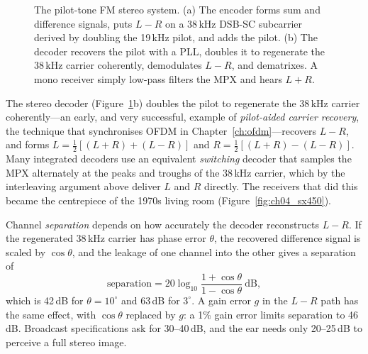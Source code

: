 \begin{figure}[htbp]
\caption{The pilot-tone FM stereo system. (a) The encoder forms sum and difference signals, puts $L-R$ on a
38\,kHz DSB-SC subcarrier derived by doubling the 19\,kHz pilot, and adds the pilot. (b) The decoder recovers
the pilot with a PLL, doubles it to regenerate the 38\,kHz carrier coherently, demodulates $L-R$, and
dematrixes. A mono receiver simply low-pass filters the MPX and hears $L+R$.}
\label{fig:ch04_stereo_codec}
\end{figure}

The stereo decoder (Figure~\ref{fig:ch04_stereo_codec}b) doubles the pilot to regenerate the 38\,kHz carrier
coherently---an early, and very successful, example of \emph{pilot-aided carrier recovery}, the technique
that synchronises OFDM in Chapter~\ref{ch:ofdm}---recovers $L-R$, and forms $L=\frac12[(L+R)+(L-R)]$ and
$R=\frac12[(L+R)-(L-R)]$. Many integrated decoders use an equivalent \emph{switching} decoder that samples
the MPX alternately at the peaks and troughs of the 38\,kHz carrier, which by the interleaving argument
above deliver $L$ and $R$ directly. The receivers that did this became the centrepiece of the 1970s living
room (Figure~\ref{fig:ch04_sx450}).


Channel \emph{separation} depends on how accurately the decoder reconstructs $L-R$. If the regenerated
38\,kHz carrier has phase error $\theta$, the recovered difference signal is scaled by $\cos\theta$, and the
leakage of one channel into the other gives a separation of
\begin{equation}
\text{separation}=20\log_{10}\frac{1+\cos\theta}{1-\cos\theta}\ \text{dB},
\end{equation}
which is 42\,dB for $\theta=10^\circ$ and 63\,dB for $3^\circ$. A gain error $g$ in the $L-R$ path has the
same effect, with $\cos\theta$ replaced by $g$: a 1\% gain error limits separation to 46\,dB. Broadcast
specifications ask for 30--40\,dB, and the ear needs only 20--25\,dB to perceive a full stereo image.

